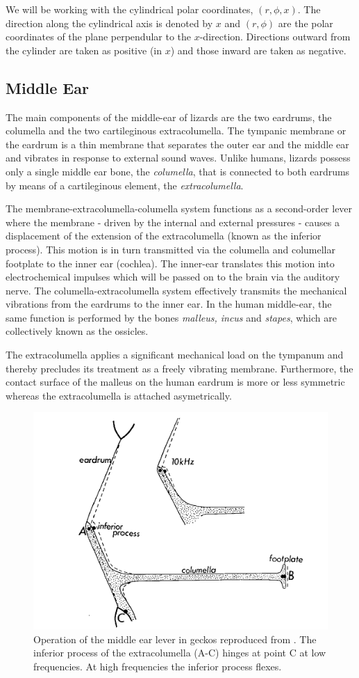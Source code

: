We will be working with the cylindrical polar coordinates, $(r,\phi,x)$. The direction
along the cylindrical axis is denoted by $x$ and $(r,\phi)$ are the polar coordinates of the plane perpendular to the $x$-direction. 
Directions outward from the cylinder are taken as positive (in $x$) and those inward are taken as negative.
\subsection{Middle Ear}\label{middleear}
The main components of the middle-ear of lizards are the two eardrums, the columella and the two cartileginous extracolumella.  
The tympanic membrane or the eardrum is a thin membrane that separates the outer ear and the
middle ear and vibrates in response to external sound waves.  Unlike humans, lizards 
possess only a single middle ear bone, the \textit{columella},
that is connected to both eardrums by means of a cartileginous element, the \textit{extracolumella}.

The membrane-extracolumella-columella system functions
as a second-order lever where the membrane - driven by the internal and external pressures - causes a displacement
of the extension of the extracolumella (known as the inferior process). This motion is in turn transmitted 
via the columella and columellar footplate to the inner ear (cochlea). The inner-ear translates this motion into
electrochemical impulses which will be passed on to the brain via the auditory nerve. The columella-extracolumella system effectively
transmits the mechanical vibrations from the eardrums to the inner ear. 
In the human middle-ear, the same function is
performed by the bones \textit{malleus, incus} and \textit{stapes}, which are collectively known
as the ossicles. 

The extracolumella applies a significant 
mechanical load on the tympanum and thereby precludes its treatment as a freely vibrating membrane. 
Furthermore, the contact surface of the malleus on the human eardrum is more or less symmetric whereas the 
extracolumella is attached asymetrically.

\begin{figure}[ht]
 \centering
 \includegraphics[width=.7\linewidth]{Diagrams/manleyextracolumellaflection.png}
 \caption[Extracolumella Flection]{Operation of the middle ear lever in geckos reproduced from \cite{manleygecko2}. The inferior process of the extracolumella (A-C) 
 hinges at point C at low frequencies. At high frequencies the inferior process flexes.}
 \label{extracolumellaflection}
\end{figure}

